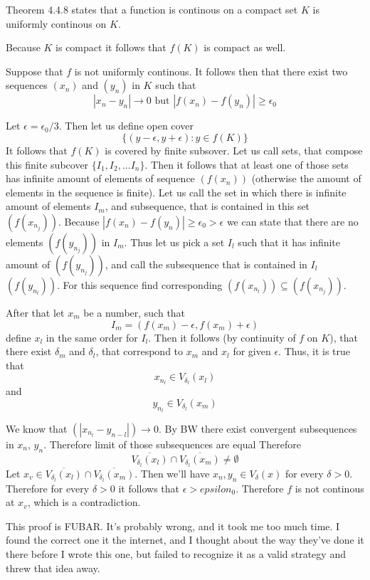 \documentclass[11pt,oneside,titlepage]{book}
\begin{document}
Theorem 4.4.8 states that a function is continous on a compact set $K$ is
uniformly continous on $K$.

Because $K$ is compact it follows that $f(K)$ is compact as well.

Suppose that $f$ is not uniformly continous. It follows then that there exist
two sequences $(x_n)$ and $(y_n)$ in $K$ such that
$$|x_n - y_n| \to 0 \text{ but } |f(x_n) - f(y_n)| \geq \epsilon_0$$

Let $\epsilon = \epsilon_0 / 3$. Then let us define open cover
$$\{(y - \epsilon, y + \epsilon): y \in f(K)\}$$
It follows that $f(K)$ is covered by finite subsover. Let
us call sets, that compose this finite subcover $\{I_1, I_2, ... I_n\}$.
Then it follows that at least one of those sets has infinite amount of
elements of sequence $(f(x_n))$ (otherwise the amount of elements in the
sequence is finite). Let us call the set in which there is
infinite amount of elements $I_m$, and subsequence, that is contained in this
set $(f(x_{n_j}))$. Because $|f(x_n) - f(y_n)| \geq \epsilon_0 > \epsilon$
we can state that there are no elements $(f(y_{n_j}))$ in $I_m$. Thus
let us pick a set $I_l$ such that it has infinite amount of $(f(y_{n_j}))$,
and call the subsequence that is contained in $I_l$ $(f(y_{n_l}))$.
For this sequence find corresponding $(f(x_{n_l})) \subseteq (f(x_{n_j}))$.

After that let $x_m$ be a number, such that
$$I_m = (f(x_m) - \epsilon, f(x_m) + \epsilon)$$
define $x_l$ in the same order for $I_l$. Then it follows (by continuity of
$f$ on $K$), that there exist $\delta_m$ and $\delta_l$, that correspond
to $x_m$ and $x_l$ for given $\epsilon$. Thus, it is true that
$$x_{n_l} \in V_{\delta_l}(x_l)$$
and
$$y_{n_l} \in V_{\delta_l}(x_m)$$

We know that $(|x_{n_l} - y_{n -l}|) \to 0$. By BW there exist convergent
subsequences in $x_n$, $y_n$. Therefore limit of those subsequences are equal
Therefore
$$\overline{V_{\delta_l}(x_l)} \cap \overline{V_{\delta_l}(x_m)} \neq
\emptyset$$
Let $x_v \in \overline{V_{\delta_l}(x_l)} \cap \overline{V_{\delta_l}(x_m)}$.
Then we'll have
$x_n, y_n \in V_\delta(x)$ for every $\delta > 0$. Therefore
for every $\delta > 0$ it follows that $\epsilon > epsilon_0$. Therefore
$f$ is not continous at $x_v$, which is a contradiction. 

This proof is FUBAR. It's probably wrong, and it took me too much time.
I found the correct one it the internet, and I thought about the way
they've done it there before I wrote this one, but failed to recognize
it as a valid strategy and threw that idea away.
\end{document}
